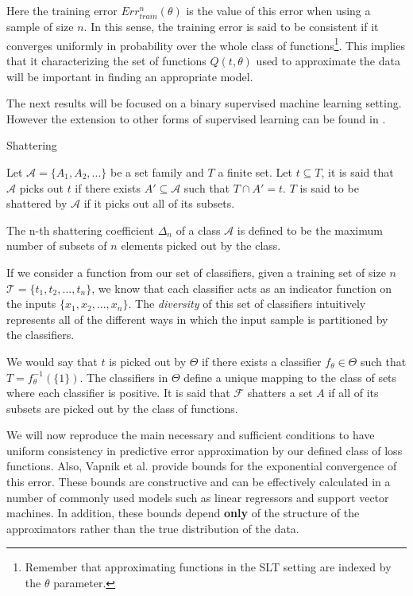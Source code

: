 
Here the training error $Err^{n}_{train}(\theta)$ is the value of this error when using a sample of size $n$. In this sense, the training error is said to be consistent if it converges uniformly in probability over the whole class of functions\footnote{Remember that approximating functions in the SLT setting are indexed by the $\theta$ parameter.}. This implies that it characterizing the set of functions $Q(t,\theta)$ used to approximate the data will be important in finding an appropriate model. %

The next results will be focused on a binary supervised machine learning setting. However the extension to other forms of supervised learning can be found in \cite{cherkassky-learning2007}. 

\begin{definition}{Shattering}
	
	Let $\mathcal {A}= \{A_1,A_{2},\dots \}$ be a set family and $T$ a finite set. Let $t \subseteq T$, it is said that $\mathcal {A}$ picks out $t$ if there exists $A' \subseteq \mathcal {A} $ such that $ T \cap A' = t$. $T$ is said to be shattered by $\mathcal {A}$ if it picks out all of its subsets.
	
	
\end{definition}

The n-th shattering coefficient $\Delta_n$ of a class $\mathcal {A}$ is defined to be the maximum number of subsets of $n$ elements picked out by the class. 

If we consider a function from our set of classifiers, given a training set of size $n$
$\mathcal {T} = \{ t_1,t_2,...,t_n  \}$, we know that each classifier acts as an indicator function on the inputs $\{ x_1,x_2,...,x_n  \}$. The \textit{diversity} of this set of classifiers intuitively represents all of the different ways in which the input sample is partitioned by the classifiers. 

We would say that $t$ is picked out by $\Theta$ if there exists a classifier $f_{\theta} \in \Theta$ such that $T = f_{\theta}^{-1}(\{1\})$. The classifiers in $\Theta$ define a unique mapping to the class of sets where each classifier is positive. It is said that $\mathcal {F}$ shatters a set $A$ if all of its subsets are picked out by the class of functions.

We will now reproduce the main necessary and sufficient conditions to have uniform consistency in predictive error approximation by our defined class of loss functions. Also,
Vapnik et al. provide bounds for the exponential convergence of this error. These bounds are constructive and can be effectively calculated in a number of commonly used models such as linear regressors and support vector machines. In addition, these bounds depend \textbf{only} of the structure of the approximators rather than the true distribution of the data. 


